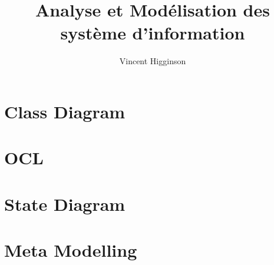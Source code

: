 \documentclass[french]{book}
\title{Analyse et Modélisation des système d'information}
\author{Vincent Higginson}
\begin{document}
\maketitle

\frontmatter
\maketitle
\tableofcontents

\mainmatter



\chapter{Class Diagram}

\chapter{OCL}

\chapter{State Diagram}

\chapter{Meta Modelling}

\backmatter
\end{document}
